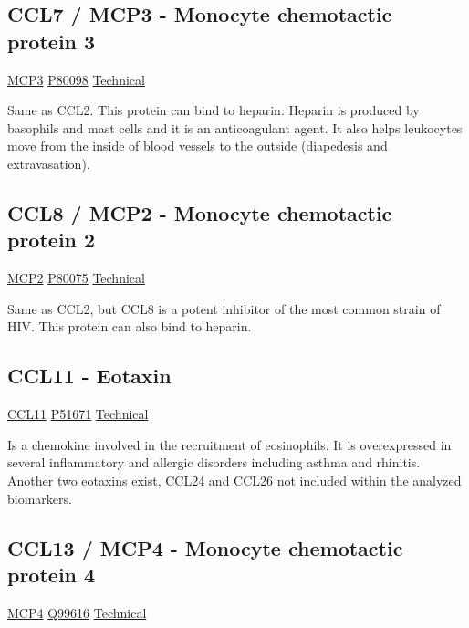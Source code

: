 \subsection{CCL7 / MCP3 - Monocyte chemotactic protein 3}

\href{https://en.wikipedia.org/wiki/CCL7}{MCP3}
\href{http://www.uniprot.org/uniprot/P80098}{P80098}
\href{https://olink.com/products-services/target/protein/?assayID=5065}{Technical}

Same as CCL2. This protein can bind to heparin. Heparin is produced by basophils and mast cells and it is an anticoagulant agent. It also helps leukocytes move from the inside of blood vessels to the outside (diapedesis and extravasation).

\subsection{CCL8 / MCP2 - Monocyte chemotactic protein 2}

\href{https://en.wikipedia.org/wiki/CCL8}{MCP2}
\href{http://www.uniprot.org/uniprot/P80075}{P80075}
\href{https://olink.com/products-services/target/protein/?assayID=5123}{Technical}

Same as CCL2, but CCL8 is a potent inhibitor of the most common strain of HIV. This protein can also bind to heparin.

\subsection{CCL11 - Eotaxin}

\href{https://en.wikipedia.org/wiki/Eotaxin}{CCL11}
\href{http://www.uniprot.org/uniprot/P51671}{P51671}
\href{https://olink.com/products-services/target/protein/?assayID=5044}{Technical}

Is a chemokine involved in the recruitment of eosinophils. It is overexpressed in several inflammatory and allergic disorders including asthma and rhinitis. Another two eotaxins exist, CCL24 and CCL26 not included within the analyzed biomarkers.

\subsection{CCL13 / MCP4 - Monocyte chemotactic protein 4}

\href{https://en.wikipedia.org/wiki/CCL13}{MCP4}
\href{http://www.uniprot.org/uniprot/Q99616}{Q99616}
\href{https://olink.com/products-services/target/protein/?assayID=5043}{Technical}

